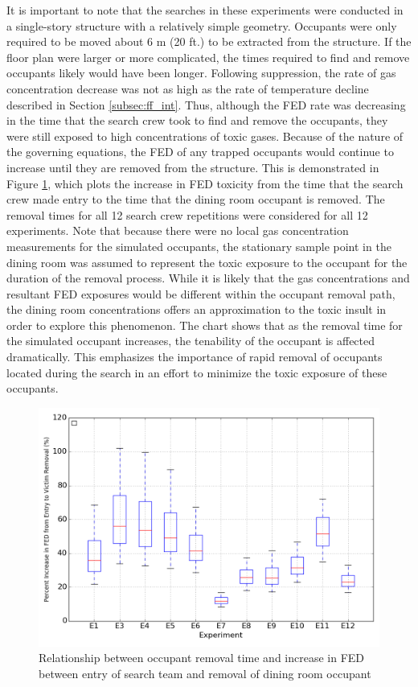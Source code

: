 \documentclass[12pt,oneside]{article}
\begin{document}
It is important to note that the searches in these experiments were conducted in a single-story structure with a relatively simple geometry. Occupants were only required to be moved about 6 m (20 ft.) to be extracted from the structure. If the floor plan were larger or more complicated, the times required to find and remove occupants likely would have been longer. Following suppression, the rate of gas concentration decrease was not as high as the rate of temperature decline described in Section \ref{subsec:ff_int}. Thus, although the FED rate was decreasing in the time that the search crew took to find and remove the occupants, they were still exposed to high concentrations of toxic gases. Because of the nature of the governing equations, the FED of any trapped occupants would continue to increase until they are removed from the structure. This is demonstrated in Figure \ref{fig:vic_removal}, which plots the increase in FED toxicity from the time that the search crew made entry to the time that the dining room occupant is removed. The removal times for all 12 search crew repetitions were considered for all 12 experiments. Note that because there were no local gas concentration measurements for the simulated occupants, the stationary sample point in the dining room was assumed to represent the toxic exposure to the occupant for the duration of the removal process. While it is likely that the gas concentrations and resultant FED exposures would be different within the occupant removal path, the dining room concentrations offers an approximation to the toxic insult in order to explore this phenomenon. The chart shows that as the removal time for the simulated occupant increases, the tenability of the occupant is affected dramatically. This emphasizes the importance of rapid removal of occupants located during the search in an effort to minimize the toxic exposure of these occupants. 

\begin{figure}[!ht]
	\centering
	\includegraphics[width=.75\textwidth]{../Figures/victim_removal/V1}
	\caption[Relationship between occupant removal time and increase in FED between entry of search team and removal of dining room occupant]{Relationship between occupant removal time and increase in FED between entry of search team and removal of dining room occupant}
	\label{fig:vic_removal}
\end{figure}
\end{document}
